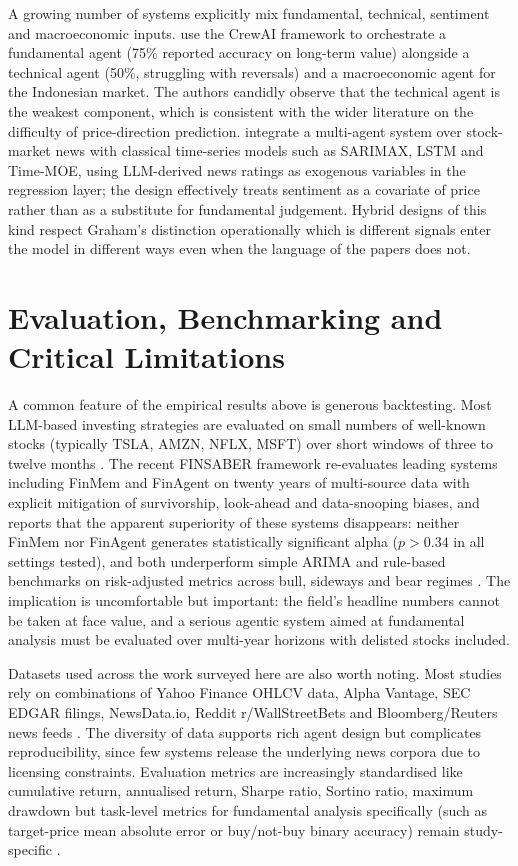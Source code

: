 A growing number of systems explicitly mix fundamental, technical,
sentiment and macroeconomic inputs. \citet{setyowidodo2025} use the
CrewAI framework to orchestrate a fundamental agent (75\%
reported accuracy on long-term value) alongside a technical agent
(50\%, struggling with reversals) and a macroeconomic agent
for the Indonesian market. The authors candidly observe that the
technical agent is the weakest component, which is consistent with
the wider literature on the difficulty of price-direction prediction.
\citet{mashaly2025} integrate a multi-agent system over stock-market
news with classical time-series models such as SARIMAX, LSTM and
Time-MOE, using LLM-derived news ratings as exogenous variables in
the regression layer; the design effectively treats sentiment as a
covariate of price rather than as a substitute for fundamental
judgement. Hybrid designs of this kind respect Graham's distinction
operationally which is different signals enter the model in different
ways even when the language of the papers does not.

\section{Evaluation, Benchmarking and Critical Limitations}
\label{sec:evaluation}

A common feature of the empirical results above is generous
backtesting. Most LLM-based investing strategies are evaluated on
small numbers of well-known stocks (typically TSLA, AMZN, NFLX, MSFT)
over short windows of three to twelve months \citep{Li2026FINSABER}.
The recent FINSABER framework re-evaluates leading systems including
FinMem and FinAgent on twenty years of multi-source data with
explicit mitigation of survivorship, look-ahead and data-snooping
biases, and reports that the apparent superiority of these systems
disappears: neither FinMem nor FinAgent generates statistically
significant alpha ($p > 0.34$ in all settings tested), and both
underperform simple ARIMA and rule-based benchmarks on risk-adjusted
metrics across bull, sideways and bear regimes
\citep{Li2026FINSABER}. The implication is uncomfortable but
important: the field's headline numbers cannot be taken at face
value, and a serious agentic system aimed at fundamental analysis
must be evaluated over multi-year horizons with delisted stocks
included.

Datasets used across the work surveyed here are also worth noting.
Most studies rely on combinations of Yahoo Finance OHLCV data, Alpha
Vantage, SEC EDGAR filings, NewsData.io, Reddit r/WallStreetBets and
Bloomberg/Reuters news feeds
\citep{mattaparty2025,bharadwaj2025,yu2025finmem}. The diversity of
data supports rich agent design but complicates reproducibility,
since few systems release the underlying news corpora due to
licensing constraints. Evaluation metrics are increasingly
standardised like cumulative return, annualised return, Sharpe ratio,
Sortino ratio, maximum drawdown but task-level metrics for
fundamental analysis specifically (such as target-price mean absolute
error or buy/not-buy binary accuracy) remain study-specific
\citep{han2024}.

